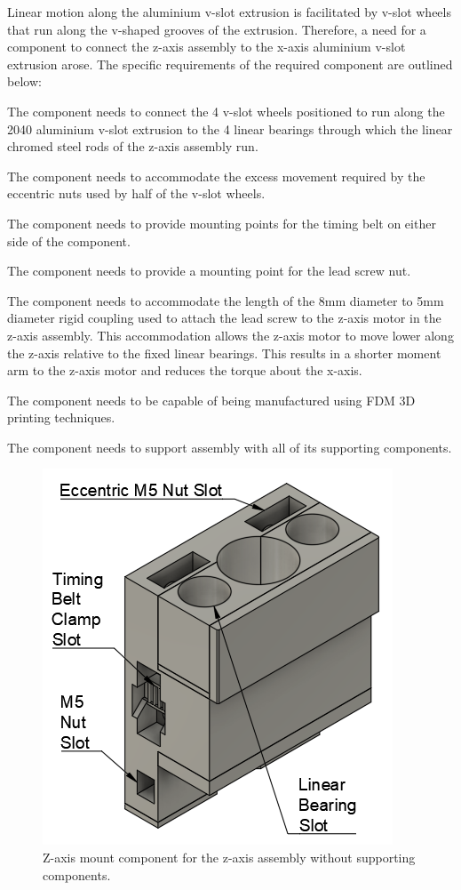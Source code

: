 Linear motion along the aluminium v-slot extrusion is facilitated by v-slot wheels that run along the v-shaped grooves of the extrusion. Therefore, a need for a component to connect the z-axis assembly to the x-axis aluminium v-slot extrusion arose. The specific requirements of the required component are outlined below:

\begin{compactitem}
	\item The component needs to connect the 4 v-slot wheels positioned to run along the 2040 aluminium v-slot extrusion to the 4 linear bearings through which the linear chromed steel rods of the z-axis assembly run.
	\item The component needs to accommodate the excess movement required by the eccentric nuts used by half of the v-slot wheels.
	\item The component needs to provide mounting points for the timing belt on either side of the component.
	\item The component needs to provide a mounting point for the lead screw nut.
	\item The component needs to accommodate the length of the 8mm diameter to 5mm diameter rigid coupling used to attach the lead screw to the z-axis motor in the z-axis assembly. This accommodation allows the z-axis motor to move lower along the z-axis relative to the fixed linear bearings. This results in a shorter moment arm to the z-axis motor and reduces the torque about the x-axis.
	\item The component needs to be capable of being manufactured using FDM 3D printing techniques.
	\item The component needs to support assembly with all of its supporting components.
\end{compactitem}

\begin{figure}[H]
	\centering
	\includegraphics[width=0.35\linewidth]{figures/z-axis-mount.png}
	\caption{Z-axis mount component for the z-axis assembly without supporting components.}
	\label{fig:z-axis-mount}
\end{figure}

